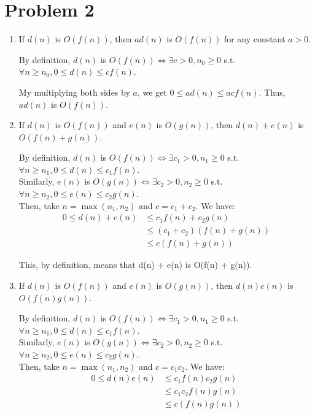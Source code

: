 \documentclass{cs1204}
\begin{document}
\section*{Problem 2}
\begin{enumerate}
    \item If $d(n)$ is $O(f(n))$, then $ad(n)$ is $O(f(n))$ for any constant $a > 0$.

    By definition, $d(n)$ is $O(f(n)) \iff \exists c > 0, n_0 \geq 0$ s.t. $\forall n \geq n_0, 0 \leq d(n) \leq cf(n)$.
    
    My multiplying both sides by $a$, we get $0 \leq ad(n) \leq acf(n)$. Thus, $ad(n)$ is $O(f(n))$.

    \vspace{4.5mm}
    \item If $d(n)$ is $O(f(n))$ and $e(n)$ is $O(g(n))$, then $d(n) + e(n)$ is $O(f(n) + g(n))$.
    
    By definition, $d(n)$ is $O(f(n)) \iff \exists c_1 > 0, n_1 \geq 0$ s.t. $\forall n \geq n_1, 0 \leq d(n) \leq c_1f(n)$.\\
    Similarly, $e(n)$ is $O(g(n)) \iff \exists c_2 > 0, n_2 \geq 0$ s.t. $\forall n \geq n_2, 0 \leq e(n) \leq c_2g(n)$.\\

    Then, take $n = \max(n_1, n_2)$ and $c = c_1 + c_2$. We have:
    \begin{align*}
        0 \leq d(n) + e(n) &\leq c_1f(n) + c_2g(n)\\
        &\leq (c_1 + c_2)(f(n) + g(n))\\
        &\leq c(f(n) + g(n))
    \end{align*}

    This, by definition, means that d(n) + e(n) is O(f(n) + g(n)).

    \vspace{4.5mm}
    \item If $d(n)$ is $O(f(n))$ and $e(n)$ is $O(g(n))$, then $d(n)e(n)$ is $O(f(n)g(n))$.
    
    By definition, $d(n)$ is $O(f(n)) \iff \exists c_1 > 0, n_1 \geq 0$ s.t. $\forall n \geq n_1, 0 \leq d(n) \leq c_1f(n)$.\\
    Similarly, $e(n)$ is $O(g(n)) \iff \exists c_2 > 0, n_2 \geq 0$ s.t. $\forall n \geq n_2, 0 \leq e(n) \leq c_2g(n)$.\\

    Then, take $n = \max(n_1, n_2)$ and $c = c_1c_2$. We have:
    \begin{align*}
        0 \leq d(n)e(n) &\leq c_1f(n)c_2g(n)\\
        &\leq c_1c_2f(n)g(n)\\
        &\leq c(f(n)g(n))
    \end{align*}


\end{enumerate}
\end{document}
